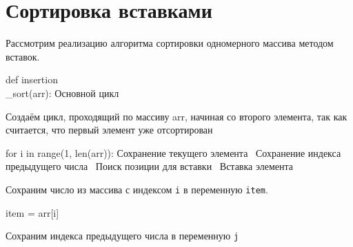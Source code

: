 \section*{Сортировка вставками}%

Рассмотрим реализацию алгоритма сортировки одномерного массива методом вставок.

\endmoddef\let\nwnotused=\nwoutput{}\nwstartdeflinemarkup\nwenddeflinemarkup
def insertion\\_sort(arr):
    \LA{}Основной цикл~{\nwtagstyle{}}\RA{}
\nwnotused{insertionSort.py}\nwendcode{}\nwdocspar

Создаём цикл, проходящий по массиву arr, начиная со второго элемента, так как считается, что первый элемент уже отсортирован

\nwenddocs{}\endmoddef\nwstartdeflinemarkup{}\nwenddeflinemarkup
for i in range(1, len(arr)):
    \LA{}Сохранение текущего элемента~{\nwtagstyle{}}\RA{}
    \LA{}Сохранение индекса предыдущего числа~{\nwtagstyle{}}\RA{}
    \LA{}Поиск позиции для вставки~{\nwtagstyle{}}\RA{}
    \LA{}Вставка элемента~{\nwtagstyle{}}\RA{}
\nwendcode{}\nwdocspar

Сохраним число из массива с индексом \texttt{i} в переменную \texttt{item}.

\nwenddocs{}\endmoddef\nwstartdeflinemarkup{}\nwenddeflinemarkup
item = arr[i]
\nwendcode{}\nwdocspar

Сохраним индекса предыдущего числа в переменную \texttt{j}


